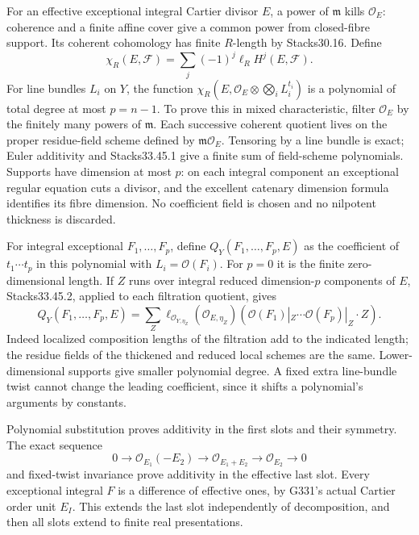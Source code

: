 \documentclass[
  11pt,
]{article}
\begin{document}
For an effective exceptional integral Cartier divisor \(E\), a power of
\(\mathfrak m\) kills \(\mathcal O_E\): coherence and a finite affine
cover give a common power from closed-fibre support. Its coherent
cohomology has finite \(R\)-length by Stacks30.16. Define
\[\chi_R(E,\mathcal F)=\sum_j(-1)^j\ell_R H^j(E,\mathcal F).\] For line
bundles \(L_i\) on \(Y\), the function
\(\chi_R(E,\mathcal O_E\otimes\bigotimes_i L_i^{t_i})\) is a polynomial
of total degree at most \(p=n-1\). To prove this in mixed
characteristic, filter \(\mathcal O_E\) by the finitely many powers of
\(\mathfrak m\). Each successive coherent quotient lives on the proper
residue-field scheme defined by \(\mathfrak m\mathcal O_E\). Tensoring
by a line bundle is exact; Euler additivity and Stacks33.45.1 give a
finite sum of field-scheme polynomials. Supports have dimension at most
\(p\): on each integral component an exceptional regular equation cuts a
divisor, and the excellent catenary dimension formula identifies its
fibre dimension. No coefficient field is chosen and no nilpotent
thickness is discarded.

For integral exceptional \(F_1,\ldots,F_p\), define
\(Q_Y(F_1,\ldots,F_p,E)\) as the coefficient of \(t_1\cdots t_p\) in
this polynomial with \(L_i=\mathcal O(F_i)\). For \(p=0\) it is the
finite zero-dimensional length. If \(Z\) runs over integral reduced
dimension-\(p\) components of \(E\), Stacks33.45.2, applied to each
filtration quotient, gives
\[Q_Y(F_1,\ldots,F_p,E)=\sum_Z\ell_{\mathcal O_{Y,\eta_Z}}(\mathcal O_{E,\eta_Z})(\mathcal O(F_1)|_Z\cdots\mathcal O(F_p)|_Z\cdot Z).\tag{1}\]
Indeed localized composition lengths of the filtration add to the
indicated length; the residue fields of the thickened and reduced local
schemes are the same. Lower-dimensional supports give smaller polynomial
degree. A fixed extra line-bundle twist cannot change the leading
coefficient, since it shifts a polynomial's arguments by constants.

Polynomial substitution proves additivity in the first slots and their
symmetry. The exact sequence
\[0\longrightarrow\mathcal O_{E_1}(-E_2)\longrightarrow\mathcal O_{E_1+E_2}\longrightarrow\mathcal O_{E_2}\longrightarrow0\]
and fixed-twist invariance prove additivity in the effective last slot.
Every exceptional integral \(F\) is a difference of effective ones, by
G331's actual Cartier order unit \(E_I\). This extends the last slot
independently of decomposition, and then all slots extend to finite real
presentations.
\end{document}
